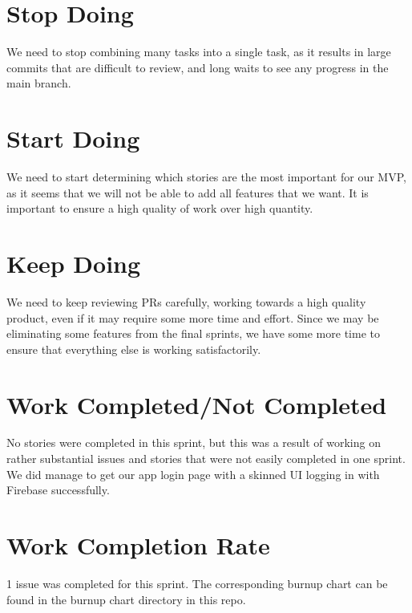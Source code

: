 \documentclass[12pt,letterpaper]{article}
\begin{document}
	\section*{Stop Doing}
We need to stop combining many tasks into a single task, as it results in large commits that are difficult to review, and long waits to see any progress in the main branch.
	\section*{Start Doing}
We need to start determining which stories are the most important for our MVP, as it seems that we will not be able to add all features that we want. 
It is important to ensure a high quality of work over high quantity.
	\section*{Keep Doing}
We need to keep reviewing PRs carefully, working towards a high quality product, even if it may require some more time and effort. Since we may be eliminating some features from the final sprints, we have some more time to ensure that everything else is working satisfactorily.
	\section*{Work Completed/Not Completed}
No stories were completed in this sprint, but this was a result of working on rather substantial issues and stories that were not easily completed in one sprint.
We did manage to get our app login page with a skinned UI logging in with Firebase successfully.
	\section*{Work Completion Rate}

1 issue was completed for this sprint. The corresponding burnup chart can be found in the burnup chart directory in this repo.
\end{document}
